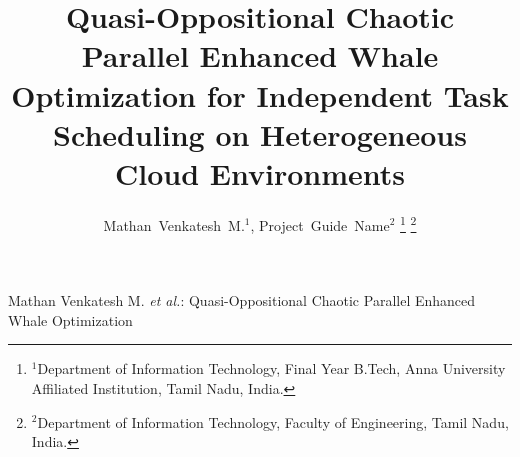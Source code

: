 \documentclass[journal]{IEEEtran}
\begin{document}
\title{Quasi-Oppositional Chaotic Parallel Enhanced Whale Optimization for Independent Task Scheduling on Heterogeneous Cloud Environments}

\author{Mathan~Venkatesh~M.$^{1}$, Project~Guide~Name$^{2}$%
\thanks{$^{1}$Department of Information Technology, Final Year B.Tech, Anna University Affiliated Institution, Tamil Nadu, India.}%
\thanks{$^{2}$Department of Information Technology, Faculty of Engineering, Tamil Nadu, India.}%
}

%
{Mathan Venkatesh M. \MakeLowercase{\textit{et al.}}: Quasi-Oppositional Chaotic Parallel Enhanced Whale Optimization}

\maketitle
\end{document}
